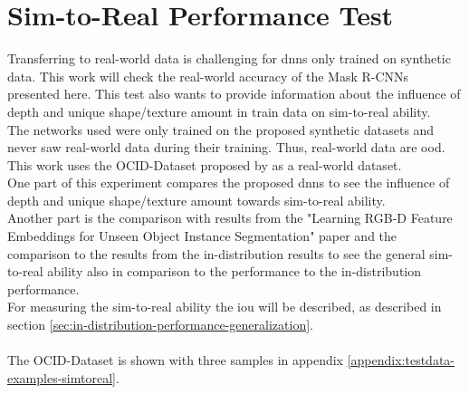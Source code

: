 	
	
	\section{Sim-to-Real Performance Test}
	\label{sec:simt-to-real-performance-test}
		Transferring to real-world data is challenging for \ac{dnn}s only trained on synthetic data. This work will check the real-world accuracy of the Mask R-CNNs presented here. This test also wants to provide information about the influence of depth and unique shape/texture amount in train data on sim-to-real ability.\\
		The networks used were only trained on the proposed synthetic datasets and never saw real-world data during their training. Thus, real-world data are \acl{ood}. This work uses the OCID-Dataset proposed by \citeauthor{Suchi2019} as a real-world dataset.\\
		One part of this experiment compares the proposed \ac{dnn}s to see the influence of depth and unique shape/texture amount towards sim-to-real ability.\\
		Another part is the comparison with results from the "Learning RGB-D Feature Embeddings for Unseen Object Instance Segmentation" \cite{Xiang2021} paper and the comparison to the results from the in-distribution results to see the general sim-to-real ability also in comparison to the performance to the in-distribution performance.\\
		For measuring the sim-to-real ability the \ac{iou} will be described, as described in section \ref{sec:in-distribution-performance-generalization}.\\
		\\
		The OCID-Dataset is shown with three samples in appendix \ref{appendix:testdata-examples-simtoreal}.
	
	
	
	
	
	
	
	
	


